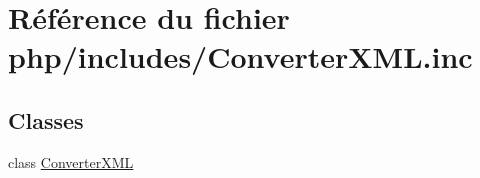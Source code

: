 \hypertarget{_converter_x_m_l_8inc}{}\section{Référence du fichier php/includes/\+Converter\+X\+ML.inc}
\label{_converter_x_m_l_8inc}
\subsection*{Classes}
\begin{DoxyCompactItemize}
\item 
class \hyperlink{class_converter_x_m_l}{Converter\+X\+ML}
\end{DoxyCompactItemize}
